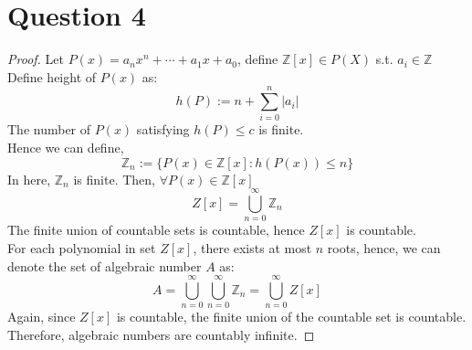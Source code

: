 \documentclass{article}
\begin{document}
\section*{Question 4}
\begin{proof}
    Let $P(x) = a_nx^n + \cdots + a_1x + a_0$, define $\mathbb{Z}[x] \in P(X)$ s.t. $a_i \in \mathbb{Z}$
    \\
    Define height of $P(x)$ as:
    \[ h(P) := n + \sum_{i = 0}^{n} |a_i| \]
    The number of $P(x)$ satisfying $h(P) \leq c$ is finite.
    \\
    Hence we can define,
    \[ \mathbb{Z}_n := \{ P(x) \in \mathbb{Z}[x]: h(P(x)) \leq n \} \]
    In here, $\mathbb{Z}_n$ is finite. Then, $\forall P(x) \in \mathbb{Z}[x]$
    \[ Z[x] = \bigcup_{n=0}^{\infty} \mathbb{Z}_n \]
    The finite union of countable sets is countable, hence $Z[x]$ is countable.
    \\
    For each polynomial in set $Z[x]$, there exists at most $n$ roots, hence, we can denote the set of algebraic number $A$ as:
    \[ A = \bigcup_{n=0}^{\infty} \bigcup_{n=0}^{\infty} \mathbb{Z}_n =  \bigcup_{n=0}^{\infty} Z[x] \]
    Again, since $Z[x]$ is countable, the finite union of the countable set is countable.
    \\
    Therefore, algebraic numbers are countably infinite.
\end{proof}
\end{document}

